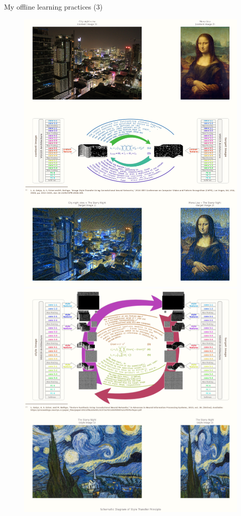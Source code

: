 \documentclass{beamer}
\begin{document}
	\begin{frame}[fragile]{My offline learning practices (3)}
		\begin{figure}[!htb]
			\vspace{-.25em}
			\centering\includegraphics[width=\linewidth]{images/deep_learning_4_1.png}
			\endminipage\hfill
			\centering\includegraphics[width=\linewidth]{images/deep_learning_4_2.png}

\end{figure}
\end{frame}
\end{document}
